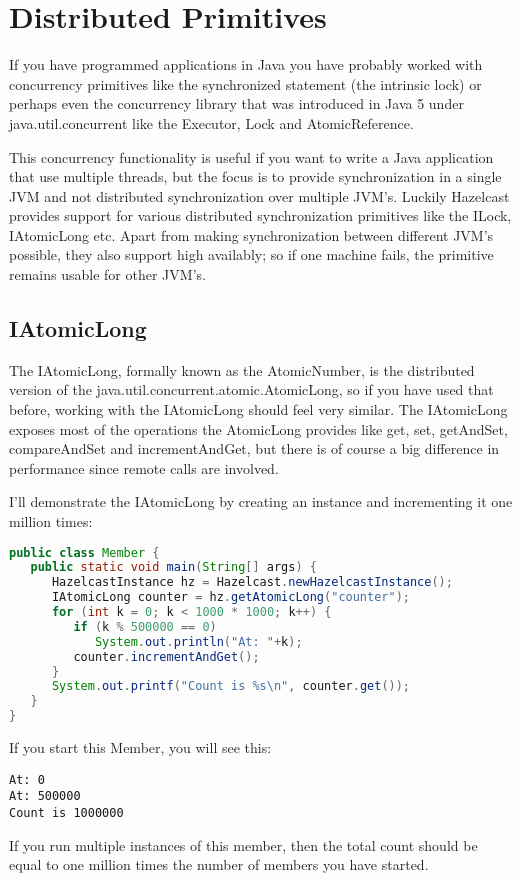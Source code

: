 \chapter{Distributed Primitives}
If you have programmed applications in Java you have probably worked with concurrency primitives like the synchronized statement (the intrinsic lock) or perhaps even the concurrency library that was introduced in Java 5 under java.util.concurrent like the Executor, Lock and AtomicReference.

This concurrency functionality is useful if you want to write a Java application that use multiple threads, but the focus is to provide synchronization in a single JVM and not distributed synchronization over multiple JVM's. Luckily Hazelcast provides support for various distributed synchronization primitives like the ILock, IAtomicLong etc. Apart from making synchronization between different JVM's possible, they also support high availably; so if one machine fails, the primitive remains usable for other JVM's.

\section{IAtomicLong}
The IAtomicLong, formally known as the AtomicNumber, is the distributed version of the java.util.concurrent.atomic.AtomicLong, so if you have used that before, working with the IAtomicLong should feel very similar. The IAtomicLong exposes most of the operations the AtomicLong provides like get, set, getAndSet, compareAndSet and incrementAndGet, but there is of course a big difference in performance since remote calls are involved.

I'll demonstrate the IAtomicLong by creating an instance and incrementing it one million times:
\begin{lstlisting}[language=java]
public class Member {
   public static void main(String[] args) {
      HazelcastInstance hz = Hazelcast.newHazelcastInstance();
      IAtomicLong counter = hz.getAtomicLong("counter");
      for (int k = 0; k < 1000 * 1000; k++) {
         if (k % 500000 == 0) 
            System.out.println("At: "+k);
         counter.incrementAndGet();
      }
      System.out.printf("Count is %s\n", counter.get());
   }
}
\end{lstlisting}
If you start this Member, you will see this:
\begin{lstlisting}
At: 0
At: 500000
Count is 1000000
\end{lstlisting}
If you run multiple instances of this member, then the total count should be equal to one million times the number of members you have started.

